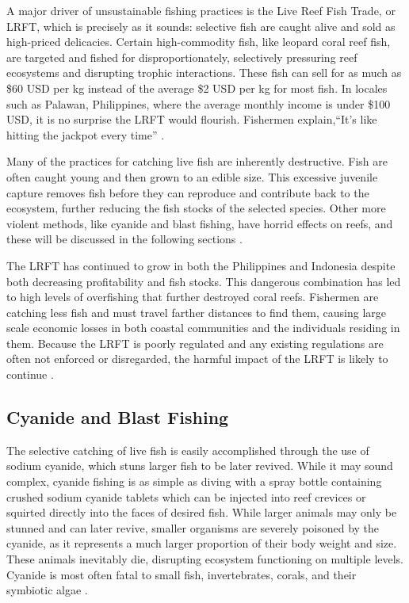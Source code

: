 \documentclass{book}\usepackage{knitr}
\begin{document}
\begin{knitrout}
\begin{kframe}
A major driver of unsustainable fishing practices is the Live Reef Fish Trade, or LRFT, which is precisely as it sounds: selective fish are caught alive and sold as high-priced delicacies. Certain high-commodity fish, like leopard coral reef fish, are targeted and fished for disproportionately, selectively pressuring reef ecosystems and disrupting trophic interactions. These fish can sell for as much as \$60 USD per kg instead of the average \$2 USD per kg for most fish. In locales such as Palawan, Philippines, where the average monthly income is under \$100 USD, it is no surprise the LRFT would flourish. Fishermen explain,``It's like hitting the jackpot every time'' \citep{10.2307/40603032}. 

Many of the practices for catching live fish are inherently destructive. Fish are often caught young and then grown to an edible size. This excessive juvenile capture removes fish before they can reproduce and contribute back to the ecosystem, further reducing the fish stocks of the selected species. Other more violent methods, like cyanide and blast fishing, have horrid effects on reefs, and these will be discussed in the following sections \citep{10.2307/40603032}.  

The LRFT has continued to grow in both the Philippines and Indonesia despite both decreasing profitability and fish stocks. This dangerous combination has led to high levels of overfishing that further destroyed coral reefs. Fishermen are catching less fish and must travel farther distances to find them, causing large scale economic losses in both coastal communities and the individuals residing in them. Because the LRFT is poorly regulated and any existing regulations are often not enforced or disregarded, the harmful impact of the LRFT is likely to continue \citep{10.2307/40603032}.

\subsection{Cyanide and Blast Fishing}

The selective catching of live fish is easily accomplished through the use of sodium cyanide, which stuns larger fish to be later revived. While it may sound complex, cyanide fishing is as simple as diving with a spray bottle containing crushed sodium cyanide tablets which can be injected into reef crevices or squirted directly into the faces of desired fish. While larger animals may only be stunned and can later revive, smaller organisms are severely poisoned by the cyanide, as it represents a much larger proportion of their body weight and size. These animals inevitably die, disrupting ecosystem functioning on multiple levels. Cyanide is most often fatal to small fish, invertebrates, corals, and their symbiotic algae \citep{wwfcyanide}.


\end{kframe}
\end{knitrout}
\end{document}
